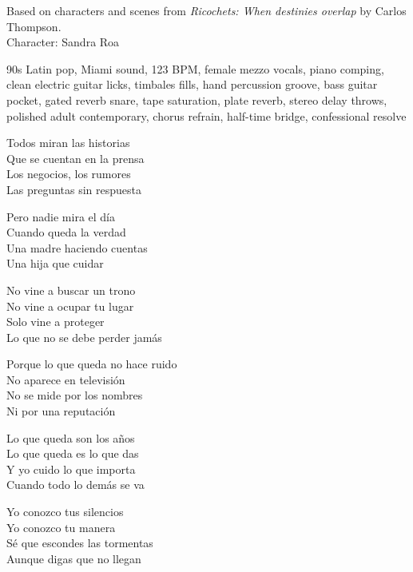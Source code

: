
\begin{notes}
Based on characters and scenes from \emph{Ricochets: When destinies overlap} by Carlos Thompson.\\
Character: Sandra Roa
\end{notes}
\begin{style}
90s Latin pop, Miami sound, 123 BPM, female mezzo vocals, piano comping, clean electric guitar licks, timbales fills, hand percussion groove, bass guitar pocket, gated reverb snare, tape saturation, plate reverb, stereo delay throws, polished adult contemporary, chorus refrain, half-time bridge, confessional resolve
\end{style}
\begin{lyrics}

Todos miran las historias\\
Que se cuentan en la prensa\\
Los negocios, los rumores\\
Las preguntas sin respuesta

Pero nadie mira el día\\
Cuando queda la verdad\\
Una madre haciendo cuentas\\
Una hija que cuidar


No vine a buscar un trono\\
No vine a ocupar tu lugar\\
Solo vine a proteger\\
Lo que no se debe perder jamás


Porque lo que queda no hace ruido\\
No aparece en televisión\\
No se mide por los nombres\\
Ni por una reputación

Lo que queda son los años\\
Lo que queda es lo que das\\
Y yo cuido lo que importa\\
Cuando todo lo demás se va


Yo conozco tus silencios\\
Yo conozco tu manera\\
Sé que escondes las tormentas\\
Aunque digas que no llegan


\end{lyrics}

